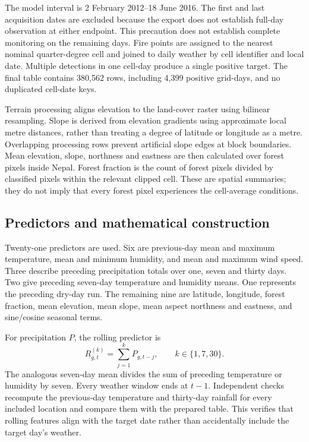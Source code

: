 \documentclass[conference,a4paper]{IEEEtran}
\begin{document}
The model interval is 2 February 2012--18 June 2016. The first and last acquisition dates are excluded because the export does not establish full-day observation at either endpoint. This precaution does not establish complete monitoring on the remaining days. Fire points are assigned to the nearest nominal quarter-degree cell and joined to daily weather by cell identifier and local date. Multiple detections in one cell-day produce a single positive target. The final table contains 380,562 rows, including 4,399 positive grid-days, and no duplicated cell-date keys.

Terrain processing aligns elevation to the land-cover raster using bilinear resampling. Slope is derived from elevation gradients using approximate local metre distances, rather than treating a degree of latitude or longitude as a metre. Overlapping processing rows prevent artificial slope edges at block boundaries. Mean elevation, slope, northness and eastness are then calculated over forest pixels inside Nepal. Forest fraction is the count of forest pixels divided by classified pixels within the relevant clipped cell. These are spatial summaries; they do not imply that every forest pixel experiences the cell-average conditions.

\subsection{Predictors and mathematical construction}
Twenty-one predictors are used. Six are previous-day mean and maximum temperature, mean and minimum humidity, and mean and maximum wind speed. Three describe preceding precipitation totals over one, seven and thirty days. Two give preceding seven-day temperature and humidity means. One represents the preceding dry-day run. The remaining nine are latitude, longitude, forest fraction, mean elevation, mean slope, mean aspect northness and eastness, and sine/cosine seasonal terms.

For precipitation $P$, the rolling predictor is
\begin{equation}
R^{(k)}_{g,t}=\sum_{j=1}^{k}P_{g,t-j},\qquad k\in\{1,7,30\}.
\end{equation}
The analogous seven-day mean divides the sum of preceding temperature or humidity by seven. Every weather window ends at $t-1$. Independent checks recompute the previous-day temperature and thirty-day rainfall for every included location and compare them with the prepared table. This verifies that rolling features align with the target date rather than accidentally include the target day's weather.
\end{document}
